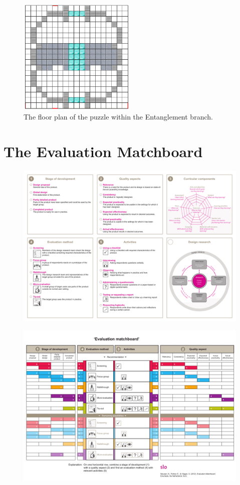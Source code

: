 \documentclass[11pt,twoside]{report} %
\begin{document}
\begin{figure}[h!]
\centering
\includegraphics[width=0.5\textwidth]{ent-puzzle}
\caption{The floor plan of the puzzle within the Entanglement branch.}
\label{fig:ent-puzzle}
\end{figure}

\newpage

\section{The Evaluation Matchboard}
\label{app:evamatchboard}

\begin{figure}[h]
\centering
\includegraphics[angle=90, height=.75\textheight]{Evaluation_matchboard-1}
\end{figure}

\begin{figure}[h]
\centering
\includegraphics[angle=90, height=\textheight]{Evaluation_matchboard-2}
\end{figure}
\end{document}
